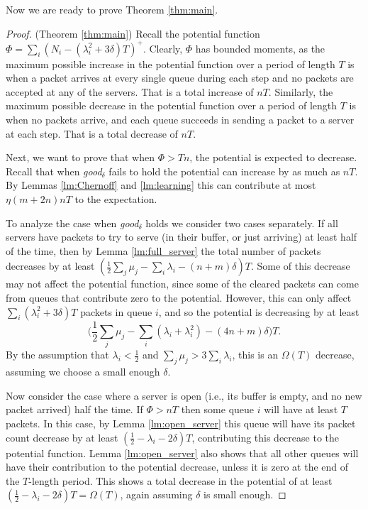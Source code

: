 Now we are ready to prove Theorem \ref{thm:main}.
\begin{proof} (Theorem \ref{thm:main}) 
Recall the potential function $\Phi=\sum_i (N_i-(\lambda^2_i+3\delta) T)^+$. Clearly, $\Phi$ has bounded moments, as the maximum possible increase in the potential function over a period of length $T$ is when a packet arrives at every single queue during each step and no packets are accepted at any of the servers. That is a total increase of $nT$. Similarly, the maximum possible decrease in the potential function over a period of length $T$ is when no packets arrive, and each queue succeeds in sending a packet to a server at each step. That is a total decrease of $nT$. 

Next, we want to prove that when $\Phi>Tn$, the potential is expected to decrease. Recall that when \emph{good}$_\delta$ fails to hold the potential can increase by as much as $nT$. By Lemmas \ref{lm:Chernoff} and \ref{lm:learning} this can contribute at most $\eta (m+2n)nT$ to the expectation.

To analyze the case when \emph{good}$_\delta$ holds we consider two cases separately. If all servers have packets to try to serve (in their buffer, or just arriving) at least half of the time, then by Lemma \ref{lm:full_server} the total number of packets decreases by at least $(\frac12 \sum_j \mu_j -\sum_i\lambda_i -(n+m)\delta)T$. Some of this decrease may not affect the potential function, since some of the cleared packets can come from queues that contribute zero to the potential. However, this can only affect $\sum_i (\lambda^2_i+3\delta) T$ packets in queue $i$, and so the potential is decreasing by at least 
\begin{equation}
\label{eq:decrease2}
\Big(\frac12 \sum_j \mu_j -\sum_i(\lambda_i+\lambda_i^2) -(4n+m)\delta \Big)T. 
\end{equation}
By the assumption that $\lambda_i< \frac12$ and $\sum_j \mu_j >3\sum_i \lambda_i$, this is an $\Omega(T)$ decrease, assuming we choose a small enough $\delta$.

Now consider the case where a server is open (i.e., its buffer is empty, and no new packet arrived) half the time. If $\Phi>nT$ then some queue $i$ will have at least $T$ packets. In this case, by Lemma \ref{lm:open_server} this queue will have its packet count decrease by at least
$(\frac12 -\lambda_i-2\delta)T$, contributing this decrease to the potential function. Lemma \ref{lm:open_server} also shows that all other queues will have their contribution to the potential decrease, unless it is zero at the end of the $T$-length period. This shows a total decrease in the potential of at least 
$(\frac12 -\lambda_i-2\delta)T=\Omega(T)$, again assuming $\delta$ is small enough. 


\end{proof}
